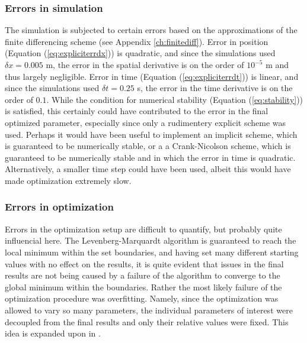 \documentclass[letterpaper,titlepage,oneside]{report}
\begin{document}
\subsubsection*{Errors in simulation}
The simulation is subjected to certain errors based on the approximations
of the finite differencing scheme (see Appendix \ref{ch:finitediff}).
Error in position (Equation (\ref{eq:expliciterrdx})) is quadratic, and since
the simulations used $\delta x = 0.005$ m, the error in the spatial
derivative is on the order of $10^{-5}$ m and thus largely negligible.
Error in time (Equation (\ref{eq:expliciterrdt})) is linear, and since
the simulations used $\delta t = 0.25$ s, the error in the time derivative
is on the order of $0.1$. While the condition for numerical stability
(Equation (\ref{eq:stability})) is
satisfied, this certainly could have contributed to the
error in the final optimized parameter, especially since only a rudimentery
explicit scheme was used. Perhaps it would have been useful to implement
an implicit scheme, which is guaranteed to be numerically stable, or a
a Crank-Nicolson scheme, which is guaranteed to be numerically stable and
in which the error in time is quadratic.
Alternatively, a smaller time step could have been used, albeit this would
have made optimization extremely slow.

\subsubsection*{Errors in optimization}
Errors in the optimization setup are difficult to quantify, but probably
quite influencial here. The Levenberg-Marquardt algorithm is guaranteed
to reach the local minimum within the set boundaries, and having set
many different starting values with no effect on the results, it is quite
evident that issues in the final results are not being caused by a failure
of the algorithm to converge to the global minimum within the boundaries.
Rather the most likely failure of the optimization procedure was overfitting.
Namely, since the optimization was allowed to vary so many parameters, the
individual parameters of interest were decoupled from the final results
and only their relative values were fixed. This idea is expanded upon in
.
\end{document}
